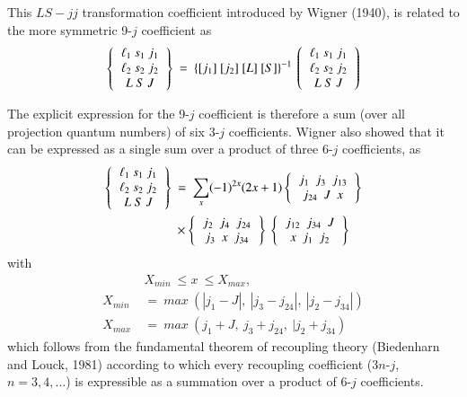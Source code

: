 This $LS-jj$ transformation coefficient introduced by Wigner (1940), is related to the more symmetric 9-$j$ coefficient as
\begin{equation}
\left\{
\begin{tabular}{c}
$\ell_1 \ s_1 \ j_1$\\   
$\ell_2 \ s_2 \ j_2$\\ 
$L \ S \ J$\\ 
\end{tabular}
\right\} \ =\ \{ [j_1]\ [j_2]\ [L]\ [S] \}^{-1}\
\left(
\begin{tabular}{c}
$\ell_1 \ s_1 \ j_1$\\   
$\ell_2 \ s_2 \ j_2$\\ 
$L \ S \ J$\\ 
\end{tabular} 
\right) \label{chap7-eq51}
\end{equation}

The explicit expression for the 9-$j$ coefficient is therefore a sum (over all projection quantum numbers) of six 3-$j$ coefficients. Wigner also showed that it can be expressed as a single sum over a product of three 6-$j$ coefficients, as
\begin{equation}
\begin{split}
\left\{
\begin{tabular}{c}
$\ell_1 \ s_1 \ j_1$\\   
$\ell_2 \ s_2 \ j_2$\\ 
$L \ S \ J$\\ \end{tabular} 
\right\} \
& =\ \sum_x (-1)^{2x} (2x+1) 
\left\{ 
\begin{tabular}{c}
$j_1\ \ j_3\ \ j_{13}$\\ 
$j_{24}\ \ J\ \ x$ \\ 
\end{tabular} 
\right\}\\
& \times \left\{
\begin{tabular}{c}
$j_2\ \ j_4\ \ j_{24}$\\ 
$j_{3}\ \ x\ \ j_{34}$ \\ 
\end{tabular} 
\right\} \
\left\{ 
\begin{tabular}{c} 
$j_{12}\ \ j_{34}\ \ J$\\ 
$x\ \ j_1\ \ j_2$ \\ 
\end{tabular} 
\right\} \label{chap7-eq52}
\end{split}
\end{equation}
with 
\begin{equation}
\begin{split}
& X_{min} \ \leq x \ \leq X_{max},\\
X_{min} \ & =\ max \ (|j_1-J|,\ |j_3-j_{24}|,\ |j_2-j_{34}|)\\
X_{max} \ & =\ max \ (j_1+J,\ j_3+j_{24},\ |j_2+j_{34})\label{chap7-eq53}
\end{split}
\end{equation}
which follows from the fundamental theorem of recoupling theory (Biedenharn and Louck, 1981) according to which every recoupling coefficient (3$n$-$j$, $n=3,4,\ldots$) is expressible as a summation over a product of 6-$j$ coefficients.

